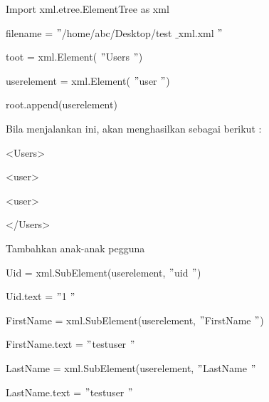 \noindent 
Import xml.etree.ElementTree as xml \par
\vspace{12pt}
\noindent 
{\fontsize{10pt}{10pt}\selectfont filename =  $ " $/home/abc/Desktop/test $  \_  $xml.xml $ " $} \par
\noindent 
{\fontsize{10pt}{10pt}\selectfont toot = xml.Element( $ " $Users $ " $)} \par
\noindent 
{\fontsize{10pt}{10pt}\selectfont userelement = xml.Element( $ " $user $ " $)} \par
\noindent 
{\fontsize{10pt}{10pt}\selectfont root.append(userelement)} \par
\noindent 
\vspace{10pt}
\noindent 
Bila menjalankan ini, akan menghasilkan sebagai berikut : \par
\noindent 
{\fontsize{10pt}{10pt}\selectfont <Users>} \par
\noindent 
{\fontsize{10pt}{10pt}\selectfont  \hspace*{0.5in} <user>} \par
\noindent 
{\fontsize{10pt}{10pt}\selectfont  \hspace*{0.5in} <user>} \par
\noindent 
{\fontsize{10pt}{10pt}\selectfont </Users>} \par
\vspace{10pt}
\vspace{10pt}
\vspace{10pt}
\noindent 
Tambahkan anak-anak pegguna \par
\vspace{10pt}
\noindent 
{\fontsize{10pt}{10pt}\selectfont Uid = xml.SubElement(userelement,  $ " $uid $ " $)} \par
\noindent 
{\fontsize{10pt}{10pt}\selectfont Uid.text =  $ " $1 $ " $} \par
\vspace{10pt}
\noindent 
{\fontsize{10pt}{10pt}\selectfont FirstName = xml.SubElement(userelement,  $ " $FirstName $ " $)} \par
\noindent 
{\fontsize{10pt}{10pt}\selectfont FirstName.text =  $ " $testuser $ " $} \par
\vspace{10pt}
\noindent 
{\fontsize{10pt}{10pt}\selectfont LastName = xml.SubElement(userelement,  $ " $LastName $ " $} \par
\noindent 
{\fontsize{10pt}{10pt}\selectfont LastName.text =  $ " $testuser $ " $} \par
\vspace{10pt}
